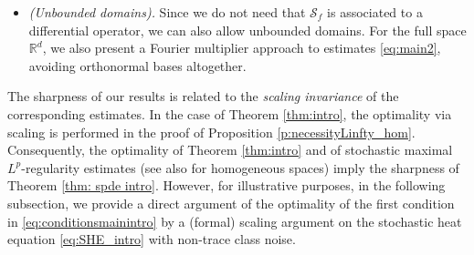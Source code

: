 \documentclass[reqno]{amsart}
\theoremstyle{plain}
\theoremstyle{remark}
\theoremstyle{plain}
\numberwithin{equation}{section}
\newcommand\cO{\mathcal{O}}
\def\R{{\mathbb R}}
\newcommand{\1}{\one}
\newcommand{\Sf}{\mathcal{S}_{f}}
\begin{document}
\begin{itemize}
    This fact greatly \emph{simplifies and improves} the obtained bounds in the literature, see Subsection \ref{subsection SPDE comparison} for a detailed comparison. Let us point out that, due to the generic optimality of the bound \eqref{eq:f_n_growth_in_general}, bounds for \eqref{eq:BM} in terms of $\|g\|_{L^2(\cO)}$ could so far only be obtained for $d<6$, while we obtain them for any dimension $d$.
    \item \emph{(Unbounded domains).} Since we do not need that $\Sf$ is associated to a differential operator, we can also allow unbounded domains.  For the full space $\R^d$, we also present a Fourier multiplier approach to estimates \eqref{eq:main2}, avoiding orthonormal bases altogether.
\end{itemize}

The sharpness of our results is related to the \emph{scaling invariance} of the corresponding estimates. In the case of Theorem \ref{thm:intro}, the optimality via scaling is performed in the proof of Proposition \ref{p:necessityLinfty_hom}. Consequently, the optimality of Theorem \ref{thm:intro} and of stochastic maximal $L^p$-regularity estimates \cite{MaximalLpregularity} (see also \cite[Subsection 6.2]{ALV21} for homogeneous spaces) imply the sharpness of Theorem \ref{thm: spde intro}. However, for illustrative purposes, in the following subsection, we provide a direct argument of the optimality of the first condition in \eqref{eq:conditionsmainintro} by a (formal) scaling argument on the stochastic heat equation \eqref{eq:SHE_intro} with non-trace class noise.
\end{document}
